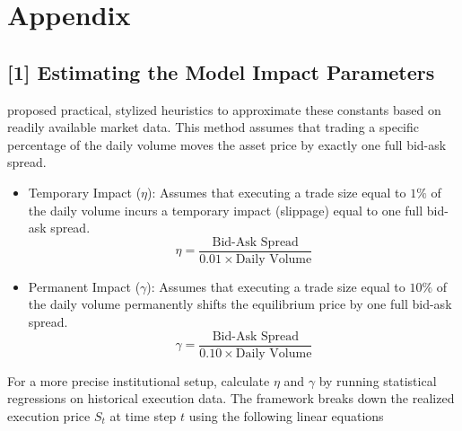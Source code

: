 \section*{Appendix}

\subsection*{[1] Estimating the Model Impact Parameters}

\cite{online:orderbook-optimal-liquidation} proposed practical, stylized heuristics to approximate these constants based on readily available market data. This method assumes that trading a specific percentage of the daily volume moves the asset price by exactly one full bid-ask spread.
\begin{itemize}
\item Temporary Impact ($\eta$): Assumes that executing a trade size equal to $1\%$ of the daily volume incurs a temporary impact (slippage) equal to one full bid-ask spread.
$$\eta =\frac{\text{Bid-Ask\ Spread}}{0.01\times \text{Daily\ Volume}}$$

\item Permanent Impact ($\gamma$): Assumes that executing a trade size equal to $10\%$ of the daily volume permanently shifts the equilibrium price by one full bid-ask spread.
$$\gamma =\frac{\text{Bid-Ask\ Spread}}{0.10\times \text{Daily\ Volume}}$$
\end{itemize}

For a more precise institutional setup, calculate $\eta$ and $\gamma$ by running statistical regressions on historical execution data. The \cite{online:orderbook-optimal-liquidation} framework breaks down the realized execution price $S_{t}$ at time step $t$ using the following linear equations

